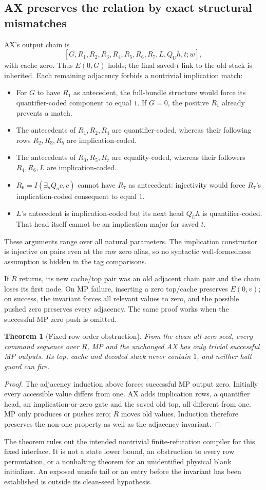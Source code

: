 \documentclass[11pt]{article}
\newtheorem{theorem}{Theorem}
\begin{document}
\subsection*{AX preserves the relation by exact structural mismatches}
AX's output chain is
\[
 [G,R_1,R_2,R_3,R_4,R_5,R_6,R_7,L,Q_Uh,t;w],
\]
with cache zero. Thus $E(0,G)$ holds; the final saved-$t$ link to the old stack is inherited. Each remaining adjacency forbids a nontrivial implication match:
\begin{itemize}
\item For $G$ to have $R_1$ as antecedent, the full-bundle structure would force its quantifier-coded component to equal $1$. If $G=0$, the positive $R_1$ already prevents a match.
\item The antecedents of $R_1,R_2,R_4$ are quantifier-coded, whereas their following rows $R_2,R_3,R_5$ are implication-coded.
\item The antecedents of $R_3,R_5,R_7$ are equality-coded, whereas their followers $R_4,R_6,L$ are implication-coded.
\item $R_6=I(\exists_aQ_ac,c)$ cannot have $R_7$ as antecedent: injectivity would force $R_7$'s implication-coded consequent to equal $1$.
\item $L$'s antecedent is implication-coded but its next head $Q_Uh$ is quantifier-coded. That head itself cannot be an implication major for saved $t$.
\end{itemize}
These arguments range over all natural parameters. The implication constructor is injective on pairs even at the raw zero alias, so no syntactic well-formedness assumption is hidden in the tag comparisons.

If $R$ returns, its new cache/top pair was an old adjacent chain pair and the chain loses its first node. On MP failure, inserting a zero top/cache preserves $E(0,v)$; on success, the invariant forces all relevant values to zero, and the possible pushed zero preserves every adjacency. The same proof works when the successful-MP zero push is omitted.

\begin{theorem}[Fixed row order obstruction]
From the clean all-zero seed, every command sequence over $R$, MP and the unchanged AX has only trivial successful MP outputs. Its top, cache and decoded stack never contain $1$, and neither halt guard can fire.
\end{theorem}
\begin{proof}
The adjacency induction above forces successful MP output zero. Initially every accessible value differs from one. AX adds implication rows, a quantifier head, an implication-or-zero gate and the saved old top, all different from one. MP only produces or pushes zero; $R$ moves old values. Induction therefore preserves the non-one property as well as the adjacency invariant.
\end{proof}
The theorem rules out the intended nontrivial finite-refutation compiler for this fixed interface. It is not a state lower bound, an obstruction to every row permutation, or a nonhalting theorem for an unidentified physical blank initializer. An exposed unsafe tail or an entry before the invariant has been established is outside its clean-seed hypothesis.
\end{document}
